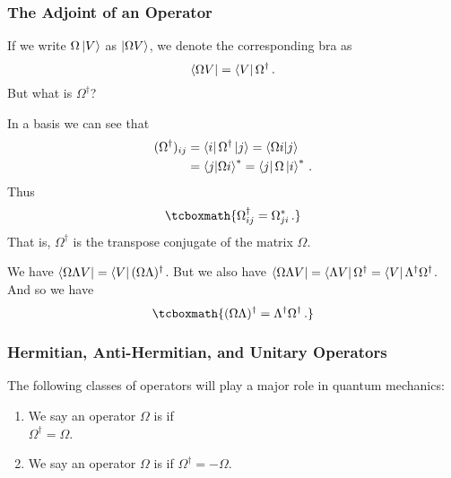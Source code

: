 
\subsubsection{The Adjoint of an Operator}

If we write $\Omega \ket{V}$ as $\ket{\Omega V}$, we denote the corresponding bra as
\begin{equation}
    \bra{\Omega V} = \bra{V} \Omega^\dagger\,.
\end{equation}
But what is $\Omega^\dagger$?

In a basis we can see that
\begin{align}
    (\Omega^\dagger)_{ij} &= \bra{i}\Omega^\dagger\ket{j} = \braket{\Omega i}{j} \\
    &= \braket{j}{\Omega i}^* = \bra{j}\Omega\ket{i}^*\,.
\end{align}
Thus
\begin{equation}\label{operator adjoint elements}
    \tcboxmath{\Omega^\dagger_{ij} = \Omega^*_{ji}\,.}
\end{equation}
That is, $\Omega^\dagger$ is the transpose conjugate of the matrix $\Omega$.

We have $\bra{\Omega \Lambda V} = \bra{V}(\Omega \Lambda)^\dagger$. But we also have $\bra{\Omega \Lambda V} = \bra{\Lambda V}\Omega^\dagger = \bra{V}\Lambda^\dagger \Omega^\dagger$. And so we have
\begin{equation}\label{product of adjoint operators}
    \tcboxmath{(\Omega \Lambda)^\dagger = \Lambda^\dagger \Omega^\dagger\,.}
\end{equation}


\subsubsection{Hermitian, Anti-Hermitian, and Unitary Operators}

\begin{shaded*}
The following classes of operators will play a major role in quantum mechanics:
\begin{enumerate}
    \item We say an operator $\Omega$ is  if\\ $\Omega^\dagger = \Omega$.
    \item We say an operator $\Omega$ is  if $\Omega^\dagger = -\Omega$.
\end{enumerate}
\end{shaded*}

